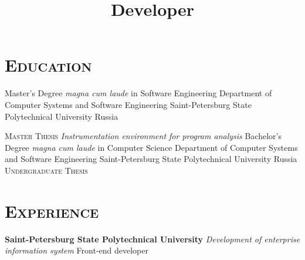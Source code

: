 \documentclass[12pt,a4paper]{moderncv}
\title     {Developer}
\begin{document}

\let\ssection\section
\renewcommand{\section}[1]{\vspace*{-2ex}\ssection{#1}}

\maketitle

\section{\textsc{Education}}
%
        {Master's Degree \textit{magna cum laude} in Software Engineering}
        {Department of Computer Systems and Software Engineering}
        {Saint-Petersburg State Polytechnical University}
        {Russia}{}

%
\cvitem{---}
       {\textsc{Master Thesis}}
       {\emph{Instrumentation environment for program analysis}}
       {\small }
%
        {Bachelor's Degree \textit{magna cum laude} in Computer Science}
        {Department of Computer Systems and Software Engineering}
        {Saint-Petersburg State Polytechnical University}
        {Russia}{}
%
\cvitem{---}
       {\textsc{Undergraduate Thesis}}
       {\emph{}
       }
       {\small }


\section{\textsc{Experience}}
%
%

{\textbf{Saint-Petersburg State Polytechnical University}\newline
 \textit{Development of enterprise information system}\newline
         Front-end developer}
\end{document}
